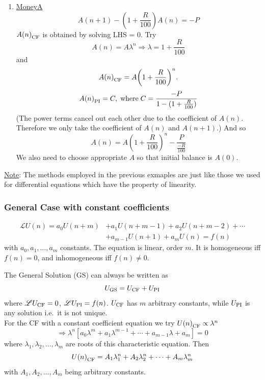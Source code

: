 \documentclass[12pt]{report}
\theoremstyle{definition}
\begin{document}
\begin{ex}
\begin{enumerate}[label = (\alph*)]
    \item \underline{MoneyA}\[
            A(n+1) - \left(1 + \frac{R}{100}\right)A(n) = -P
    \]
    ${A(n)}_{\textnormal{CF}}$ is obtained by solving LHS = 0.
    Try \[
        A(n) = A\lambda^{n} \Rightarrow{} \lambda = 1 + \frac{R}{100}
    \]and\[
    {A(n)}_{\textnormal{CF}} = A{\left(1 + \frac{R}{100}\right)}^{n}.
    \]\[
    {A(n)}_{\textnormal{PI}} = C, \;\textnormal{where}\; C = \frac{-P}{1 - (1 + \frac{R}{100})}
    \](The power terms cancel out each other due to the coefficient of $A(n)$.
    Therefore we only take the coefficient of $A(n)$ and $A(n+1)$.) And so\[
    A(n) = A{\left(1 + \frac{R}{100}\right)}^{n} - \frac{P}{\frac{-R}{100}}
    \]
    We also need to choose appropriate $A$ so that initial balance is $A(0)$.
    \end{enumerate}
    \underline{Note}: The methods employed in the previous exmaples are just like
    those we used for differential equations which have the property of linearity.
\end{ex}

\subsubsection{General Case with constant coefficients}

\[
    \begin{align*}
        \mathscr{L} U(n) = a_0 U(n + m) & + a_1 U(n + m - 1) + a_2 U(n + m - 2) + \cdots \\
                                        & + a_{m - 1} U(n + 1) + a_m U(n) = f(n)
    \end{align*}
\]with $a_0, a_1, \ldots, a_m$ constants. The equation is linear, order $m$.
It is homogeneous iff $f(n) = 0$, and inhomogeneous iff $f(n) \neq 0$.

The General Solution (GS) can always be written as\[
    U_{\textnormal{GS}} = U_{\textnormal{CF}} + U_{\textnormal{PI}}
\]where $\mathscr{L}U_{\textnormal{CF}} = 0$, $\mathscr{L}U_{\textnormal{PI}} = f(n)$.
$U_{\textnormal{CF}}$ has $m$ arbitrary constants, while $U_{\textnormal{PI}}$ is 
any solution i.e.\ it is not unique.
\medskip
\\For the CF with a constant coefficient equation we try ${U(n)}_{\textnormal{CF}} \propto \lambda^{n}$\[
    \Rightarrow{} \lambda^{n}[a_0 \lambda^{m} + a_1 \lambda^{m - 1} + \cdots + a_{m - 1}\lambda + a_{m}] = 0
\]where $\lambda_1, \lambda_2, \ldots, \lambda_m$ are roots of this characteristic equation.
Then\[
    {U(n)}_{\textnormal{CF}} = A_1 \lambda_1^{n} + A_2 \lambda_2^{n} + \cdots + A_m \lambda_m^{n}
\]with $A_1, A_2, \ldots, A_m$ being arbitrary constants.
\end{document}
